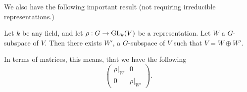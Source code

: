 
We also have the following important result (not requiring irreducible representations.)

\begin{theorem}
    Let $k$ be any field, and let $\rho: G \to  \operatorname{GL}_k(V)$ be a representation.
    Let $W$ a $G$-subspace of $V$.
    Then there exists $W'$, a $G$-subspace of $V$ such that $V = W \oplus W'$.
\end{theorem}

In terms of matrices, this means, that we have the following
\[
\begin{pmatrix}
    \rho|_W & 0 \\
    0 & \rho|_{W'}
\end{pmatrix}
.\] 

